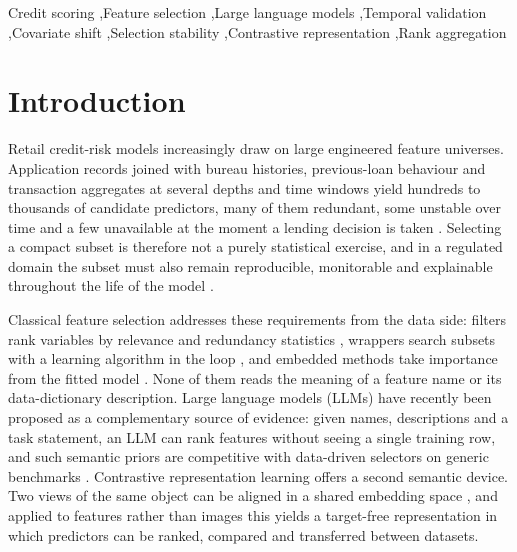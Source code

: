 \documentclass[final,5p,twocolumn]{elsarticle}
\begin{document}
\begin{frontmatter}
\begin{abstract}
\end{abstract}

\begin{keyword}
Credit scoring \sep Feature selection \sep Large language models \sep Temporal validation \sep Covariate shift \sep Selection stability \sep Contrastive representation \sep Rank aggregation
\end{keyword}

\end{frontmatter}


\section{Introduction}
\label{sec:introduction}

Retail credit-risk models increasingly draw on large engineered feature universes. Application records joined with bureau histories, previous-loan behaviour and transaction aggregates at several depths and time windows yield hundreds to thousands of candidate predictors, many of them redundant, some unstable over time and a few unavailable at the moment a lending decision is taken \cite{thomas2002,siddiqi2006}. Selecting a compact subset is therefore not a purely statistical exercise, and in a regulated domain the subset must also remain reproducible, monitorable and explainable throughout the life of the model \cite{lessmann2015,gunnarsson2021,ballegeer2025}.

Classical feature selection addresses these requirements from the data side: filters rank variables by relevance and redundancy statistics \cite{guyon2003,peng2005}, wrappers search subsets with a learning algorithm in the loop \cite{kohavi1997,guyon2002,kursa2010}, and embedded methods take importance from the fitted model \cite{tibshirani1996,lundberg2017}. None of them reads the meaning of a feature name or its data-dictionary description. Large language models (LLMs) have recently been proposed as a complementary source of evidence: given names, descriptions and a task statement, an LLM can rank features without seeing a single training row, and such semantic priors are competitive with data-driven selectors on generic benchmarks \cite{choi2022,jeong2025,li2025sigkdd,zhang2025llmlasso}. Contrastive representation learning offers a second semantic device. Two views of the same object can be aligned in a shared embedding space \cite{radford2021,oord2018}, and applied to features rather than images this yields a target-free representation in which predictors can be ranked, compared and transferred between datasets.
\end{document}
